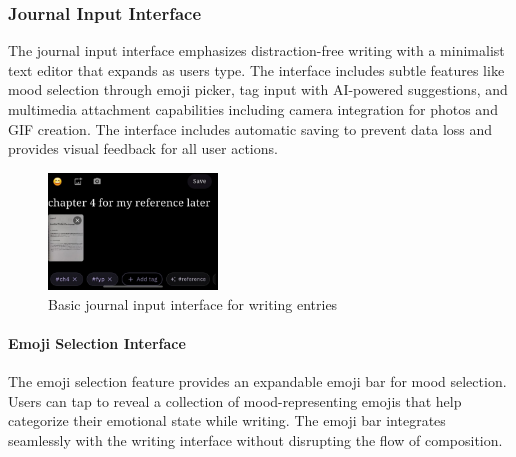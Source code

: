 \subsubsection{Journal Input Interface}

The journal input interface emphasizes distraction-free writing with a minimalist text editor that expands as users type. The interface includes subtle features like mood selection through emoji picker, tag input with AI-powered suggestions, and multimedia attachment capabilities including camera integration for photos and GIF creation. The interface includes automatic saving to prevent data loss and provides visual feedback for all user actions.

\nopagebreak
\begin{figure}[H]
\centering
\includegraphics[width=0.4\textwidth]{files/imgs/prototype/journal_input_basic.jpeg}
\caption{Basic journal input interface for writing entries}
\label{fig:journal-input-basic}
\end{figure}

\paragraph{Emoji Selection Interface}

The emoji selection feature provides an expandable emoji bar for mood selection. Users can tap to reveal a collection of mood-representing emojis that help categorize their emotional state while writing. The emoji bar integrates seamlessly with the writing interface without disrupting the flow of composition.

